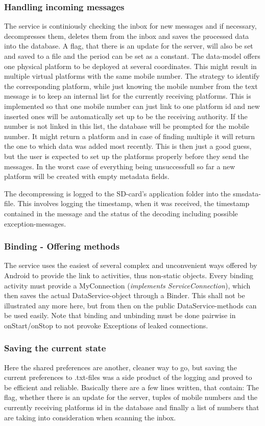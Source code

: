 \documentclass[11pt,oneside,a4paper]{scrartcl}
\begin{document}
\subsubsection{Handling incoming messages}
The service is continiously checking the inbox for new messages and if necessary, decompresses them, deletes them from the inbox and saves the processed data into the database. A flag, that there is an update for the server, will also be set and saved to a file and the period can be set as a constant.
The data-model offers one physical platform to be deployed at several coordinates. This might result in multiple virtual platforms with the same mobile number. The strategy to identify the corresponding platform, while just knowing the mobile number from the text message is to keep an internal list for the currently receiving platforms. This is implemented so that one mobile number can just link to one platform id and new inserted ones will be automatically set up to be the receiving authority.
If the number is not linked in this list, the database will be prompted for the mobile number. It might return a platform and in case of finding multiple it will return the one to which data was added most recently. This is then just a good guess, but the user is expected to set up the platforms properly before they send the messages. In the worst case of everything being unsuccessfull so far a new platform will be created with empty metadata fields. 

The decompressing is logged to the SD-card's application folder into the smsdata-file. This involves logging the timestamp, when it was received, the timestamp contained in the message and the status of the decoding including possible exception-messages.

\subsubsection{Binding - Offering methods}
The service uses the easiest of several complex and unconvenient ways offered by Android to provide the link to activities, thus non-static objects. Every binding activity must provide a MyConnection (\textit{implements ServiceConnection}), which then saves the actual DataService-object through a Binder. This shall not be illustrated any more here, but from then on the public DataService-methods can be used easily. Note that binding and unbinding must be done pairwise in onStart/onStop to not provoke Exceptions of leaked connections.

\subsubsection{Saving the current state}
Here the shared preferences are another, cleaner way to go, but saving the current preferences to .txt-files was a side product of the logging and proved to be efficient and reliable.
Basically there are a few lines written, that contain: The flag, whether there is an update for the server, tuples of mobile numbers and the currently receiving platforms id in the database and finally a list of numbers that are taking into consideration when scanning the inbox.
\end{document}
